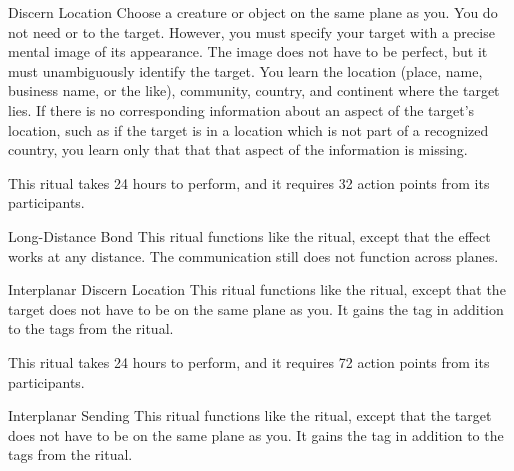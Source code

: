 \lowercase{\hypertarget{spell:Discern Location}{}}\label{spell:Discern Location}
\begin{ability}[\nth{4}]{\hypertarget{spell:Discern Location}{Discern Location}}
Choose a creature or object on the same plane as you.
You do not need  or  to the target.
However, you must specify your target with a precise mental image of its appearance.
The image does not have to be perfect, but it must unambiguously identify the target.
You learn the location (place, name, business name, or the like), community, country, and continent where the target lies.
If there is no corresponding information about an aspect of the target's location, such as if the target is in a location which is not part of a recognized country,
you learn only that that that aspect of the information is missing.

This ritual takes 24 hours to perform, and it requires 32 action points from its participants.
\end{ability}
\vspace{0.25em}



\lowercase{\hypertarget{spell:Long-Distance Bond}{}}\label{spell:Long-Distance Bond}
\begin{ability}[\nth{5}]{\hypertarget{spell:Long-Distance Bond}{Long-Distance Bond}}
This ritual functions like the  ritual, except that the effect works at any distance.
The communication still does not function across planes.
\end{ability}
\vspace{0.25em}



\lowercase{\hypertarget{spell:Interplanar Discern Location}{}}\label{spell:Interplanar Discern Location}
\begin{ability}[\nth{6}]{\hypertarget{spell:Interplanar Discern Location}{Interplanar Discern Location}}
This ritual functions like the  ritual, except that the target does not have to be on the same plane as you.
It gains the  tag in addition to the tags from the  ritual.

This ritual takes 24 hours to perform, and it requires 72 action points from its participants.
\end{ability}
\vspace{0.25em}



\lowercase{\hypertarget{spell:Interplanar Sending}{}}\label{spell:Interplanar Sending}
\begin{ability}[\nth{6}]{\hypertarget{spell:Interplanar Sending}{Interplanar Sending}}
This ritual functions like the  ritual, except that the target does not have to be on the same plane as you.
It gains the  tag in addition to the tags from the  ritual.
\end{ability}
\vspace{0.25em}



